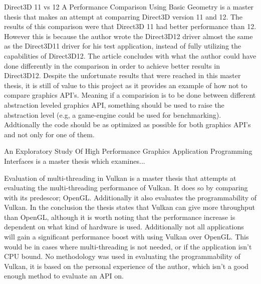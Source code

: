 Direct3D 11 vs 12 A Performance Comparison Using Basic Geometry \cite{2016_direct3d} is a master thesis that makes an attempt at comparring Direct3D version 11 and 12. 
The results of this comparison were that Direct3D 11 had better performance than 12. 
However this is because the author wrote the Direct3D12 driver almost the same as the Direct3D11 driver for his test application, instead of fully utilizing the capabilities of Direct3D12. 
The article concludes with what the author could have done differently in the comparison in order to achieve better results in Direct3D12.
Despite the unfortunate results that were reached in this master thesis, it is still of value to this project as it provides an example of how not to compare graphics API's. 
Meaning if a comparision is to be done between different abstraction leveled graphics API, something should be used to raise the abstraction level  (e.g, a game-engine could be used for benchmarking). 
Addtionally the code should be as optimized as possible for both graphics API's and not only for one of them.

An Exploratory Study Of High Performance Graphics Application Programming Interfaces \cite{2016_exploratory_gpu_api} is a master thesis which examines...

Evaluation of multi-threading in Vulkan \cite{blackert_2016_evaluation} is a master thesis that attempts at evaluating the multi-threading performance of Vulkan. It does so by comparing with its predescor; OpenGL. 
Additionally it also evaluates the programmability of Vulkan. 
In the conclusion the thesis states that Vulkan can give more throughput than OpenGL, although it is worth noting that the performance increase is dependent on what kind of hardware is used. Additionally not all applications will gain a significant performance boost with using Vulkan over OpenGL. 
This would be in cases where multi-threading is not needed, or if the application isn't CPU bound. 
No methodology was used in evaluating the programmability of Vulkan, it is based on the personal experience of the author, which isn't a good enough method to evaluate an API on.
